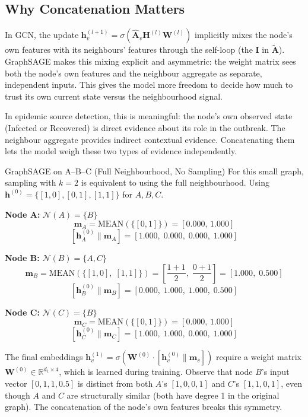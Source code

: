 \subsection{Why Concatenation Matters}

In GCN, the update $\mathbf{h}_v^{(l+1)} = \sigma(\hat{\mathbf{A}}_v \mathbf{H}^{(l)} \mathbf{W}^{(l)})$ implicitly mixes the node's own features with its neighbours' features through the self-loop (the $\mathbf{I}$ in $\tilde{\mathbf{A}}$). GraphSAGE makes this mixing explicit and asymmetric: the weight matrix sees both the node's own features and the neighbour aggregate as separate, independent inputs. This gives the model more freedom to decide how much to trust its own current state versus the neighbourhood signal.

In epidemic source detection, this is meaningful: the node's own observed state (Infected or Recovered) is direct evidence about its role in the outbreak. The neighbour aggregate provides indirect contextual evidence. Concatenating them lets the model weigh these two types of evidence independently.

\begin{examplebox}{GraphSAGE on A--B--C (Full Neighbourhood, No Sampling)}
For this small graph, sampling with $k=2$ is equivalent to using the full neighbourhood. Using $\mathbf{h}^{(0)} = \{[1,0], [0,1], [1,1]\}$ for $A, B, C$.

\medskip
\textbf{Node A:} $\mathcal{N}(A) = \{B\}$
\[
\mathbf{m}_A = \text{MEAN}\!\left(\{[0,1]\}\right) = [0.000,\, 1.000]
\]
\[
\left[\mathbf{h}_A^{(0)} \| \mathbf{m}_A\right] = [1.000,\; 0.000,\; 0.000,\; 1.000]
\]

\textbf{Node B:} $\mathcal{N}(B) = \{A, C\}$
\[
\mathbf{m}_B = \text{MEAN}\!\left(\{[1,0],\; [1,1]\}\right) = \left[\frac{1+1}{2},\; \frac{0+1}{2}\right] = [1.000,\; 0.500]
\]
\[
\left[\mathbf{h}_B^{(0)} \| \mathbf{m}_B\right] = [0.000,\; 1.000,\; 1.000,\; 0.500]
\]

\textbf{Node C:} $\mathcal{N}(C) = \{B\}$
\[
\mathbf{m}_C = \text{MEAN}\!\left(\{[0,1]\}\right) = [0.000,\, 1.000]
\]
\[
\left[\mathbf{h}_C^{(0)} \| \mathbf{m}_C\right] = [1.000,\; 1.000,\; 0.000,\; 1.000]
\]

The final embeddings $\mathbf{h}_v^{(1)} = \sigma(\mathbf{W}^{(0)} \cdot [\mathbf{h}_v^{(0)} \| \mathbf{m}_v])$ require a weight matrix $\mathbf{W}^{(0)} \in \mathbb{R}^{d_1 \times 4}$, which is learned during training. Observe that node $B$'s input vector $[0, 1, 1, 0.5]$ is distinct from both $A$'s $[1, 0, 0, 1]$ and $C$'s $[1, 1, 0, 1]$, even though $A$ and $C$ are structurally similar (both have degree 1 in the original graph). The concatenation of the node's own features breaks this symmetry.
\end{examplebox}

